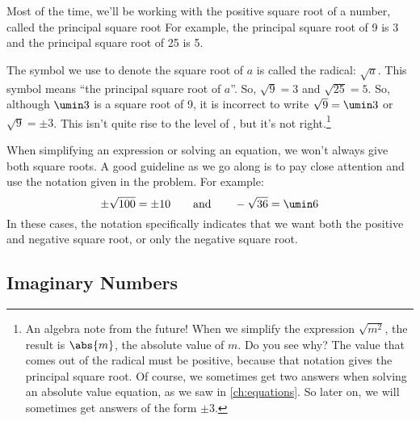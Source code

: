 Most of the time, we'll be working with the positive square root of a number, called the \gls{principal square root} For example, the principal square root of 9 is 3 and the principal square root of 25 is 5.

The symbol we use to denote the square root of $a$ is called the \gls{radical}: $\sqrt{a}$. This symbol means ``the principal square root of $a$''. So, $\sqrt{9} = 3$ and $\sqrt{25} = 5$. So, although $\umin3$ is a square root of 9, it is incorrect to write $\sqrt{9} = \umin3$ or $\sqrt{9} = \pm3$. This isn't quite rise to the level of \evilandwrong, but it's not right.\footnote{An algebra note from the future! When we simplify the expression $\sqrt{m^2}$, the result is $\abs{m}$, the absolute value of $m$. Do you see why? The value that comes out of the radical must be positive, because that notation gives the principal square root. Of course, we sometimes get two answers when solving an absolute value equation, as we saw in \cref{ch:equations}. So later on, we will sometimes get answers of the form $\pm3$.}

When simplifying an expression or solving an equation, we won't always give both square roots.  A good guideline as we go along is to pay close attention and use the notation given in the problem. For example: \[\pm\sqrt{100} = \pm10 \qquad\text{and}\qquad -\sqrt{36} = \umin6\]
In these cases, the notation specifically indicates that we want both the positive and negative square root, or only the negative square root.

%
%

\subsection{Imaginary Numbers}

